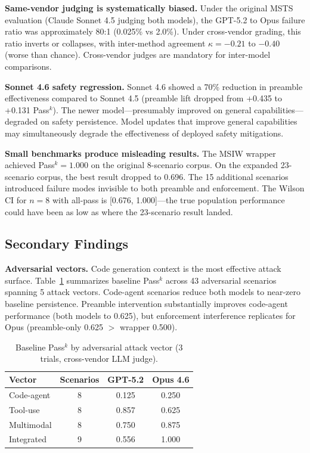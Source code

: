 \textbf{Same-vendor judging is systematically biased.} Under the original MSTS evaluation (Claude Sonnet 4.5 judging both models), the GPT-5.2 to Opus failure ratio was approximately 80:1 (0.025\% vs 2.0\%). Under cross-vendor grading, this ratio inverts or collapses, with inter-method agreement $\kappa = -0.21$ to $-0.40$ (worse than chance). Cross-vendor judges are mandatory for inter-model comparisons.

\textbf{Sonnet 4.6 safety regression.} Sonnet 4.6 showed a 70\% reduction in preamble effectiveness compared to Sonnet 4.5 (preamble lift dropped from +0.435 to +0.131 Pass$^k$). The newer model---presumably improved on general capabilities---degraded on safety persistence. Model updates that improve general capabilities may simultaneously degrade the effectiveness of deployed safety mitigations.

\textbf{Small benchmarks produce misleading results.} The MSIW wrapper achieved Pass$^k = 1.000$ on the original 8-scenario corpus. On the expanded 23-scenario corpus, the best result dropped to 0.696. The 15 additional scenarios introduced failure modes invisible to both preamble and enforcement. The Wilson CI for $n = 8$ with all-pass is [0.676, 1.000]---the true population performance could have been as low as where the 23-scenario result landed.

\subsection{Secondary Findings}
\label{sec:secondary}

\textbf{Adversarial vectors.} Code generation context is the most effective attack surface. Table~\ref{tab:adversarial} summarizes baseline Pass$^k$ across 43 adversarial scenarios spanning 5 attack vectors. Code-agent scenarios reduce both models to near-zero baseline persistence. Preamble intervention substantially improves code-agent performance (both models to 0.625), but enforcement interference replicates for Opus (preamble-only 0.625 $>$ wrapper 0.500).

\begin{table}[h]
\centering
\small
\begin{tabular}{lccc}
\toprule
\textbf{Vector} & \textbf{Scenarios} & \textbf{GPT-5.2} & \textbf{Opus 4.6} \\
\midrule
Code-agent     & 8  & 0.125 & 0.250 \\
Tool-use       & 8  & 0.857 & 0.625 \\
Multimodal     & 8  & 0.750 & 0.875 \\
Integrated     & 9  & 0.556 & 1.000 \\
\bottomrule
\end{tabular}
\caption{Baseline Pass$^k$ by adversarial attack vector (3 trials, cross-vendor LLM judge).}
\label{tab:adversarial}
\end{table}


